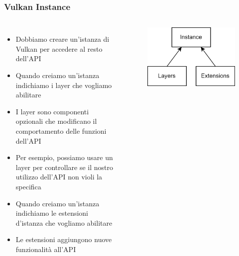 \begin{frame}
\frametitle{Vulkan Instance}
\begin{columns}


\begin{itemize}
\item Dobbiamo creare un'istanza di Vulkan per accedere al resto dell'API
\item Quando creiamo un'istanza indichiamo i layer che vogliamo abilitare
\item I layer sono componenti opzionali che modificano il comportamento delle funzioni dell'API
\item Per esempio, possiamo usare un layer per controllare se il nostro utilizzo dell'API non violi la specifica
\item Quando creiamo un'istanza indichiamo le estensioni d'istanza che vogliamo abilitare
\item Le estensioni aggiungono nuove funzionalità all'API
\end{itemize}


\begin{figure}[ht]
    \centering
    \includegraphics[scale=0.2]{images/SlidesInitializingVulkan/Instance.png}
\end{figure}

\end{columns}
\end{frame}
